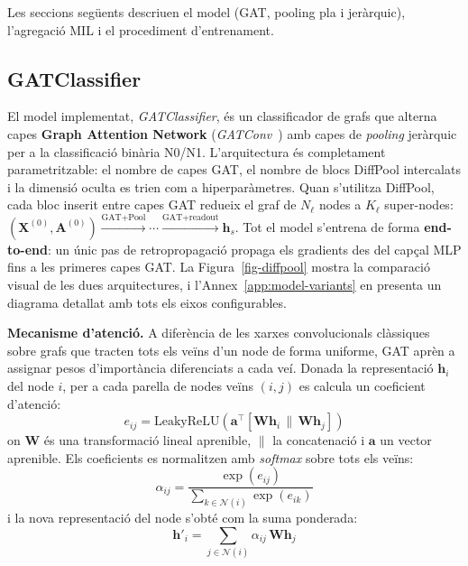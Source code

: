 \documentclass[10pt,a4paper,twocolumn,twoside]{article}
\begin{document}
Les seccions següents descriuen el model (GAT, pooling pla i jeràrquic), l'agregació MIL
i el procediment d'entrenament.

\subsection{GATClassifier}

El model implementat, \textit{GATClassifier}, és un classificador de grafs que alterna capes
\textbf{Graph Attention Network} (\textit{GATConv}~\cite{veličković2018graphattentionnetworks,fey2019fastgraphrepresentationlearning})
amb capes de \textit{pooling} jeràrquic per a la classificació binària N0/N1. L'arquitectura és
completament parametritzable: el nombre de capes GAT, el nombre de blocs DiffPool intercalats i la
dimensió oculta es trien com a hiperparàmetres. Quan s'utilitza DiffPool, cada bloc inserit entre
capes GAT redueix el graf de $N_\ell$ nodes a $K_\ell$ super-nodes:
$(\mathbf{X}^{(0)}, \mathbf{A}^{(0)}) \xrightarrow{\text{GAT+Pool}} \cdots \xrightarrow{\text{GAT+readout}} \mathbf{h}_s$.
Tot el model s'entrena de forma \textbf{end-to-end}: un únic pas de retropropagació propaga els
gradients des del capçal MLP fins a les primeres capes GAT. La Figura~\ref{fig-diffpool} mostra
la comparació visual de les dues arquitectures, i l'Annex~\ref{app:model-variants} en presenta
un diagrama detallat amb tots els eixos configurables.

\textbf{Mecanisme d'atenció.} A diferència de les xarxes convolucionals clàssiques sobre grafs que tracten
tots els veïns d'un node de forma uniforme, GAT aprèn a assignar pesos d'importància diferenciats a cada
veí. Donada la representació $\mathbf{h}_i$ del node $i$, per a cada parella de nodes
veïns $(i, j)$ es calcula un coeficient d'atenció:
\begin{equation*}
  e_{ij} = \text{LeakyReLU}\!\left(\mathbf{a}^{\top}[\mathbf{W}\mathbf{h}_i \,\|\, \mathbf{W}\mathbf{h}_j]\right)
\end{equation*}
on $\mathbf{W}$ és una transformació lineal aprenible, $\|$ la concatenació i $\mathbf{a}$ un vector
aprenible. Els coeficients es normalitzen amb \textit{softmax} sobre tots els veïns:
\begin{equation*}
  \alpha_{ij} = \frac{\exp(e_{ij})}{\sum_{k \in \mathcal{N}(i)} \exp(e_{ik})}
\end{equation*}
i la nova representació del node s'obté com la suma ponderada:
\begin{equation*}
  \mathbf{h}'_i = \sum_{j \in \mathcal{N}(i)} \alpha_{ij}\,\mathbf{W}\mathbf{h}_j
\end{equation*}
\end{document}
